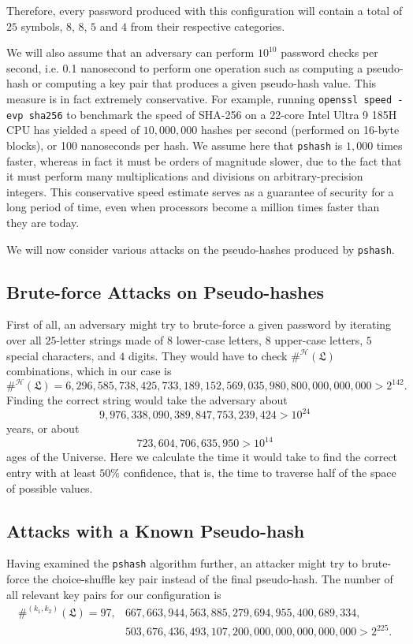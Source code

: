 \documentclass[a4paper, 10pt]{article}
\theoremstyle{plain}
\theoremstyle{definition}
\newcommand{\conf}{\mathfrak{L}}
\newcommand{\h}{\mathcal{H}}
\begin{document}
Therefore, every password produced with this configuration will contain a total of $25$ symbols, $8$, $8$, $5$ and $4$ from their respective categories.

We will also assume that an adversary can perform $10^{10}$ password checks per second, i.e. 0.1 nanosecond to perform one operation such as computing a pseudo-hash or computing a key pair that produces a given pseudo-hash value. This measure is in fact extremely conservative. For example, running \verb|openssl speed -evp sha256| to benchmark the speed of SHA-256 on a 22-core Intel Ultra 9 185H CPU has yielded a speed of $10,000,000$ hashes per second (performed on 16-byte blocks), or 100 nanoseconds per hash. We assume here that \texttt{pshash} is $1,000$ times faster, whereas in fact it must be orders of magnitude slower, due to the fact that it must perform many multiplications and divisions on arbitrary-precision integers. This conservative speed estimate serves as a guarantee of security for a long period of time, even when processors become a million times faster than they are today.

We will now consider various attacks on the pseudo-hashes produced by \texttt{pshash}.

\subsection{Brute-force Attacks on Pseudo-hashes}

First of all, an adversary might try to brute-force a given password by iterating over all $25$-letter strings made of $8$ lower-case letters, $8$ upper-case letters, $5$ special characters, and $4$ digits. They would have to check $\#^\h (\conf)$ combinations, which in our case is
\[
  \#^\h (\conf) = 
  6,296,585,738,425,733,189,152,569,035,980,800,000,000,000 > 2^{142}.
\]
Finding the correct string would take the adversary about
\[
  9,976,338,090,389,847,753,239,424 > 10^{24}
\]
years, or about
\[
  723,604,706,635,950 > 10^{14}
\]
ages of the Universe. Here we calculate the time it would take to find the correct entry with at least $50\%$ confidence, that is, the time to traverse half of the space of possible values.

\subsection{Attacks with a Known Pseudo-hash}

Having examined the \texttt{pshash} algorithm further, an attacker might try to brute-force the choice-shuffle key pair instead of the final pseudo-hash. The number of all relevant key pairs for our configuration is
\begin{align*}
  \#^{(k_1,k_2)} (\conf) =
    97,&667,663,944,563,885,279,694,955,400,689,334,\\
    &503,676,436,493,107,200,000,000,000,000,000 > 2^{225}.
\end{align*}
\end{document}
